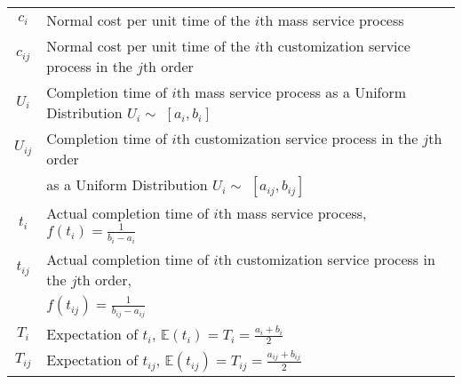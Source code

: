 \documentclass{llncs}
\begin{document}
\begin{center}
\begin{tabular}{c|l}
$c_i$\hspace{1cm} & \hspace{1cm}Normal cost per unit time of the $i$th mass service process \hspace{4cm}\\
$c_{ij}$\hspace{1cm} & \hspace{1cm}Normal cost per unit time of the $i$th customization service process in the $j$th order\hspace{4cm}\\
$U_i$\hspace{1cm} & \hspace{1cm}Completion  time  of $i$th mass service process as a Uniform Distribution $U_i\sim$ $[a_i,b_i]$ \hspace{4cm}\\
$U_{ij}$\hspace{1cm} & \hspace{1cm}Completion  time  of $i$th  customization service process in the $j$th order  \hspace{4cm}\\
\hspace{1cm} & \hspace{1cm}as a Uniform Distribution $U_i\sim$ $[a_{ij},b_{ij}]$ \hspace{4cm}\\
$t_i$\hspace{1cm} & \hspace{1cm}Actual completion time of $i$th mass service process, $f(t_{i})=\frac{1}{b_i-a_i}$ \hspace{4cm}\\
$t_{ij}$\hspace{1cm} & \hspace{1cm}Actual completion time of $i$th customization service process in the $j$th order,\hspace{4cm}\\
\hspace{1cm} & \hspace{1cm}$f(t_{ij})=\frac{1}{b_{ij}-a_{ij}}$ \hspace{4cm}\\
$T_i$\hspace{1cm} & \hspace{1cm}Expectation of $t_i$, $\mathbb{E}(t_{i})=T_{i}=\frac{a_i+b_i}{2}$ \hspace{4cm}\\
$T_{ij}$\hspace{1cm} & \hspace{1cm}Expectation of $t_{ij}$, $\mathbb{E}(t_{ij})=T_{ij}=\frac{a_{ij}+b_{ij}}{2}$ \hspace{4cm}\\

\end{tabular}
\end{center}
\end{document}
